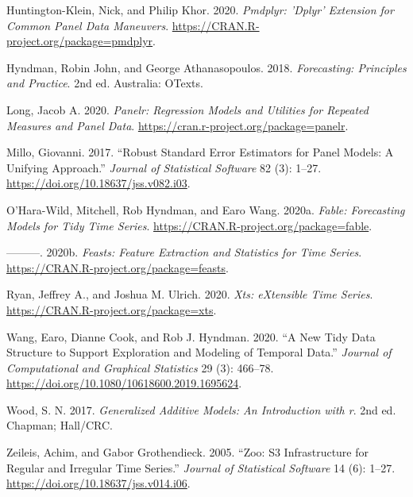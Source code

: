 \hypertarget{refs}{}
\begin{CSLReferences}{1}{0}
\leavevmode{}%
Huntington-Klein, Nick, and Philip Khor. 2020. \emph{Pmdplyr: 'Dplyr' Extension for Common Panel Data Maneuvers}. \url{https://CRAN.R-project.org/package=pmdplyr}.

\leavevmode{}%
Hyndman, Robin John, and George Athanasopoulos. 2018. \emph{Forecasting: Principles and Practice}. 2nd ed. Australia: OTexts.

\leavevmode{}%
Long, Jacob A. 2020. \emph{Panelr: Regression Models and Utilities for Repeated Measures and Panel Data}. \url{https://cran.r-project.org/package=panelr}.

\leavevmode{}%
Millo, Giovanni. 2017. {``Robust Standard Error Estimators for Panel Models: A Unifying Approach.''} \emph{Journal of Statistical Software} 82 (3): 1--27. \url{https://doi.org/10.18637/jss.v082.i03}.

\leavevmode{}%
O'Hara-Wild, Mitchell, Rob Hyndman, and Earo Wang. 2020a. \emph{Fable: Forecasting Models for Tidy Time Series}. \url{https://CRAN.R-project.org/package=fable}.

\leavevmode{}%
---------. 2020b. \emph{Feasts: Feature Extraction and Statistics for Time Series}. \url{https://CRAN.R-project.org/package=feasts}.

\leavevmode{}%
Ryan, Jeffrey A., and Joshua M. Ulrich. 2020. \emph{Xts: eXtensible Time Series}. \url{https://CRAN.R-project.org/package=xts}.

\leavevmode{}%
Wang, Earo, Dianne Cook, and Rob J. Hyndman. 2020. {``A {New} {Tidy} {Data} {Structure} to {Support} {Exploration} and {Modeling} of {Temporal} {Data}.''} \emph{Journal of Computational and Graphical Statistics} 29 (3): 466--78. \url{https://doi.org/10.1080/10618600.2019.1695624}.

\leavevmode{}%
Wood, S. N. 2017. \emph{Generalized Additive Models: An Introduction with r}. 2nd ed. Chapman; Hall/CRC.

\leavevmode{}%
Zeileis, Achim, and Gabor Grothendieck. 2005. {``Zoo: S3 Infrastructure for Regular and Irregular Time Series.''} \emph{Journal of Statistical Software} 14 (6): 1--27. \url{https://doi.org/10.18637/jss.v014.i06}.

\end{CSLReferences}

